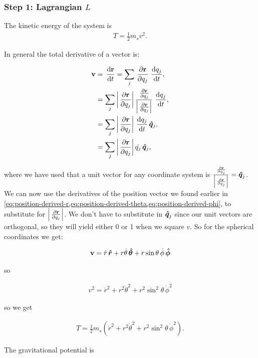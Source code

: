 \subsubsection{Step 1: Lagrangian \(L\)}
The kinetic energy of the system is
\begin{align}
    T = \frac{1}{2} m_s v^2.
\end{align}

In general the total derivative of a vector is:

\begin{align}
    \mathbf{v} &= \operatorname{}\frac{\mathrm{d} \mathbf{r}}{\mathrm{d} t} = \sum\limits_{j} \operatorname{}\frac{\partial \mathbf{r}}{\partial q_j} \operatorname{}\frac{\mathrm{d} q_j}{\mathrm{d} t}, \\
      &= \sum\limits_{j} \left|\operatorname{}\frac{\partial \mathbf{r}}{\partial q_j}\right| \frac{\operatorname{}\frac{\partial \mathbf{r}}{\partial q_j}}{\left|\operatorname{}\frac{\partial \mathbf{r}}{\partial q_j}\right|} \operatorname{}\frac{\mathrm{d} q_j}{\mathrm{d} t}, \\
      &= \sum\limits_{j} \left|\operatorname{}\frac{\partial \mathbf{r}}{\partial q_j}\right| \operatorname{}\frac{\mathrm{d} q_j}{\mathrm{d} t} \operatorname{}\!\bm{\hat{q}}_j, \\
      &= \sum\limits_{j} \left|\operatorname{}\frac{\partial \mathbf{r}}{\partial q_j}\right| \dot{q_j} \operatorname{}\!\bm{\hat{q}}_j,
    \end{align}

where we have used that a unit vector for any coordinate system is \(\frac{\operatorname{}\frac{\partial \mathbf{r}}{\partial q_j}}{\left|\operatorname{}\frac{\partial \mathbf{r}}{\partial q_j}\right|} = \operatorname{}\!\bm{\hat{q}}_j\).
We can now use the derivatives of the position vector we found earlier in \cref{eq:position-derived-r,eq:position-derived-theta,eq:position-derived-phi}, to substitute for \(\left|\operatorname{}\frac{\partial \mathbf{r}}{\partial q_j}\right|\). We don't have to substitute in \(\operatorname{}\!\bm{\hat{q}}_j\) since our unit vectors are orthogonal, so they will yield either 0 or 1 when we square \(v\). So for the spherical coordinates we get:

\begin{align}
    \mathbf{v} = \dot{r}\operatorname{}\!\bm{\hat{r}} + r\dot{\theta}\operatorname{}\!\bm{\hat{\theta}} + r\sin{\theta}\,\dot{\phi}\operatorname{}\!\bm{\hat{\phi}}
\end{align}

so

\begin{align}
    v^2 = \dot{r}^2 + r^2\dot{\theta}^2 + r^2\sin^2{\theta}\,\dot{\phi}^2
\end{align}

so we get

\begin{align}
    T = \frac{1}{2} m_s (\dot{r}^2 + r^2\dot{\theta}^2 + r^2\sin^2{\theta}\,\dot{\phi}^2).
\end{align}

The gravitational potential is 

